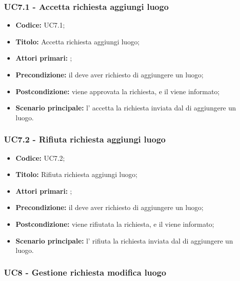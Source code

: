 \documentclass[casi-duso]{subfiles}
\begin{document}
\subsubsection{UC7.1 - Accetta richiesta aggiungi luogo}
\label{subsub:UC7.1}
\begin{itemize}
  \item \textbf{Codice:} UC7.1;
  \item \textbf{Titolo:} Accetta richiesta aggiungi luogo;
  \item \textbf{Attori primari:} ;
  \item \textbf{Precondizione:} il  deve aver richiesto di aggiungere un luogo;
  \item \textbf{Postcondizione:} viene approvata la richiesta, e il  viene informato;
  \item \textbf{Scenario principale:} l' accetta la richiesta inviata dal  di aggiungere un luogo.
\end{itemize}

\subsubsection{UC7.2 - Rifiuta richiesta aggiungi luogo}
\label{subsub:UC7.2}
\begin{itemize}
  \item \textbf{Codice:} UC7.2;
  \item \textbf{Titolo:} Rifiuta richiesta aggiungi luogo;
  \item \textbf{Attori primari:} ;
  \item \textbf{Precondizione:} il  deve aver richiesto di aggiungere un luogo;
  \item \textbf{Postcondizione:} viene rifiutata la richiesta, e il  viene informato;
  \item \textbf{Scenario principale:} l' rifiuta la richiesta inviata dal  di aggiungere un luogo.
\end{itemize}


\subsubsection{UC8 - Gestione richiesta modifica luogo}
\label{subsub:UC8}
\end{document}
